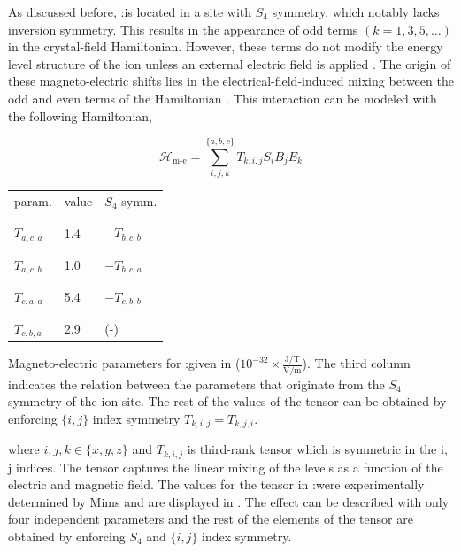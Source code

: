 As discussed before, \Er:\Ca is located in a site with $S_4$ symmetry, which notably lacks inversion symmetry. This results in the appearance of odd terms $(k=1,3,5,\dots)$ in the crystal-field Hamiltonian. However, these terms do not modify the energy level structure of the ion unless an external electric field is applied . The origin of these magneto-electric shifts lies in the electrical-field-induced mixing between the odd and even terms of the Hamiltonian . This interaction can be modeled with the following Hamiltonian,

\begin{equation}
    \mathcal{H}_{\text{m-e}} = \sum_{i,j,k}^{\{a,b,c\}} T_{k, i, j} S_{i} B_j E_k
\end{equation}

\begin{margintable}
\centering
\begin{tabular}{l|l|l}
param.         & value  & $S_4$ symm.   \\[-1em] \\ \hline \\[-1em]
$T_{a,c,a}$    & 1.4    & $-T_{b,c,b}$  \\[-1em] \\ \hline \\[-1em]
$T_{a,c,b}$    & 1.0    & $-T_{b,c,a}$  \\[-1em] \\ \hline \\[-1em]
$T_{c,a,a}$    & 5.4    & $-T_{c,b,b}$  \\[-1em] \\ \hline \\[-1em]
$T_{c,b,a}$    & 2.9    &  (-) 
\end{tabular}
\caption[Magneto-optic parameters]{Magneto-electric parameters for \Er:\Ca given in ($10^{-32} \times \frac{\text{J/T}}{\text{V/m}}$). The third column indicates the relation between the parameters that originate from the $S_4$ symmetry of the ion site. The rest of the values of the tensor can be obtained by enforcing $\{i, j\}$ index symmetry $T_{k, i, j} = T_{k, j, i}$.}
\end{margintable}

where $i,j,k \in\{x,y,z\}$ and $T_{k, i, j}$ is third-rank tensor which is symmetric in the {i, j} indices. The tensor captures the linear mixing of the levels as a function of the electric and magnetic field. The values for the tensor in \Er:\Ca were experimentally determined by Mims  and are displayed in . The effect can be described with only four independent parameters and the rest of the elements of the tensor are obtained by enforcing $S_4$ and $\{i, j\}$ index symmetry.

